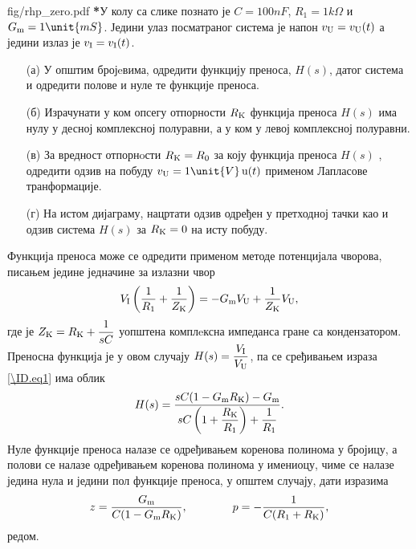 \begin{slikaDesno}[0.83]{fig/rhp_zero.pdf}
    \textbf{\color{red}*}\PID У колу са слике познато је $C = 100\unit{nF}$, 
    $R_1 = 1\unit{k\Omega}$ и
    $G_{\rm m} = 1\unit{mS}$.
    Једини улаз посматраног система је напон 
    $v_{\rm U} = v_{\rm U}(t)$ а једини излаз је 
    $v_{\rm I} = v_{\rm I}(t)$.
    \begin{itemize}
    \item[(а)] 
    У општим бројeвима, 
    одредити функцију преноса, $H(s)$, датог 
    система
    и одредити полове и нуле те функције 
    преноса. 

    \item[(б)] 
    Израчунати у ком опсегу отпорности 
    $R_{\rm K}$ функција преноса $H(s)$
    има нулу у десној комплексној полуравни, 
    а у ком у
    левој комплексној полуравни.
\end{itemize}
\end{slikaDesno}
%
\begin{itemize}
    \item[(в)] За вредност отпорнoсти 
    $R_{\rm K} = R_0$ за коју функција преноса 
    $H(s)$ 
    , одредити одзив на побуду 
    $v_{\rm U} = 1\unit{V}\,{\rm u}(t)$
    применом Лапласове транформације.
    
    \item[(г)] На истом дијаграму, нацртати 
    одзив одређен у претходној тачки као и
    одзив система $H(s)$ за $R_{\rm K} = 0$ 
    на исту побуду. 
\end{itemize} 

\RESENJE  Функција преноса може се одредити применом методе 
потенцијала чворова, писањем једине једначине за излазни чвор 
\begin{equation}
    V_{\rm I} \left( \dfrac{1}{R_1} + \dfrac{1}{Z_{\rm K}} \right) = - G_{\rm m} V_{\rm U} + \dfrac{1}{Z_{\rm K}} V_{\rm U}, \label{\ID.eq1}
\end{equation}
где је $Z_{\rm K} = R_{\rm K} + \dfrac{1}{sC}$ уопштена комплeксна импеданса гране са кондензатором. Преносна функција је 
у овом случају $H(s) = \dfrac{V_{\rm I}}{V_{\rm U}}$, па се сређивањем израза \ref{\ID.eq1} има облик 
\begin{equation}
    H(s) = \dfrac{sC(1 - G_{\rm m}R_{\rm K} ) - G_{\rm m} }{ sC\left(1 + \dfrac{R_{\rm K}}{R_1}\right) + \dfrac{1}{R_1} }. \label{\ID.eq2}
\end{equation}
Нуле функције преноса налазе се одређивањем коренова полинома у бројицу, а полови се налазе  одређивањем коренова полинома у имениоцу, чиме се 
налазе једина нула и једини пол функције преноса, у општем случају, дати изразима
\begin{equation}
    z = \dfrac{G_{\rm m}}{C(1 - G_{\rm m} R_{\rm K})}, \qquad \qquad p = - \dfrac{1}{C(R_1 + R_{\rm K})},
\end{equation}
редом.

